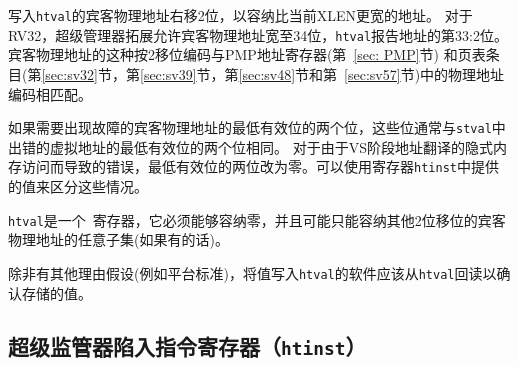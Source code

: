 \begin{commentary}
  写入{\tt htval}的宾客物理地址右移2位，以容纳比当前XLEN更宽的地址。
  对于RV32，超级管理器拓展允许宾客物理地址宽至34位，{\tt htval}报告地址的第33:2位。
  宾客物理地址的这种按2移位编码与PMP地址寄存器(第~\ref{sec: PMP}节)
  和页表条目(第\ref{sec:sv32}节，第\ref{sec:sv39}节，第\ref{sec:sv48}节和第~\ref{sec:sv57}节)中的物理地址编码相匹配。

如果需要出现故障的宾客物理地址的最低有效位的两个位，这些位通常与{\tt stval}中出错的虚拟地址的最低有效位的两个位相同。
对于由于VS阶段地址翻译的隐式内存访问而导致的错误，最低有效位的两位改为零。可以使用寄存器{\tt htinst}中提供的值来区分这些情况。
\end{commentary}

{\tt htval}是一个\warl\ 寄存器，它必须能够容纳零，并且可能只能容纳其他2位移位的宾客物理地址的任意子集(如果有的话)。

\begin{commentary}
  除非有其他理由假设(例如平台标准)，将值写入{\tt htval}的软件应该从{\tt htval}回读以确认存储的值。
\end{commentary}

\subsection{超级监管器陷入指令寄存器（{\tt htinst}）}

